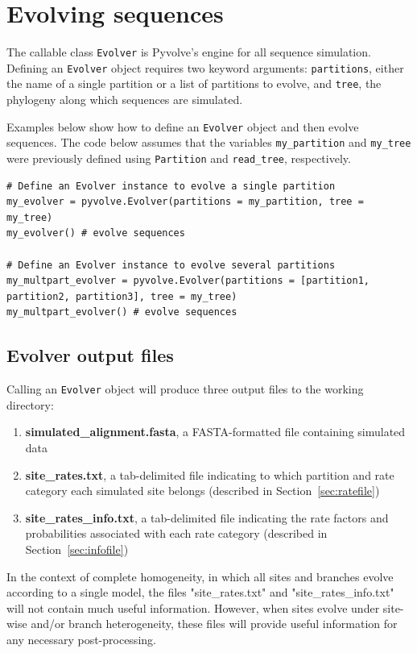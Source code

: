 \documentclass{article}
\newcommand{\code}[1]{\texttt{\small{#1}}}
\begin{document}
\section{Evolving sequences}\label{sec:evolver}

The callable class \code{Evolver} is Pyvolve's engine for all sequence simulation. Defining an \code{Evolver} object requires two keyword arguments: \code{partitions}, either the name of a single partition or a list of partitions to evolve, and \code{tree}, the phylogeny along which sequences are simulated.

Examples below show how to define an \code{Evolver} object and then evolve sequences. The code below assumes that the variables \code{my\_partition} and \code{my\_tree} were previously defined using \code{Partition} and \code{read\_tree}, respectively.
\begin{lstlisting}
# Define an Evolver instance to evolve a single partition
my_evolver = pyvolve.Evolver(partitions = my_partition, tree = my_tree)
my_evolver() # evolve sequences

# Define an Evolver instance to evolve several partitions
my_multpart_evolver = pyvolve.Evolver(partitions = [partition1, partition2, partition3], tree = my_tree)
my_multpart_evolver() # evolve sequences
\end{lstlisting}



\subsection{Evolver output files}\label{sec:output_files}

Calling an \code{Evolver} object will produce three output files to the working directory:
\begin{enumerate}
	\item \textbf{simulated\_alignment.fasta}, a FASTA-formatted file containing simulated data
	\item \textbf{site\_rates.txt}, a tab-delimited file indicating to which partition and rate category each simulated site belongs (described in Section~\ref{sec:ratefile})
	\item \textbf{site\_rates\_info.txt}, a tab-delimited file indicating the rate factors and probabilities associated with each rate category (described in Section~\ref{sec:infofile})
\end{enumerate}


In the context of complete homogeneity, in which all sites and branches evolve according to a single model, the files "site\_rates.txt" and "site\_rates\_info.txt" will not contain much useful information. However, when sites evolve under site-wise and/or branch heterogeneity, these files will provide useful information for any necessary post-processing.
\end{document}

